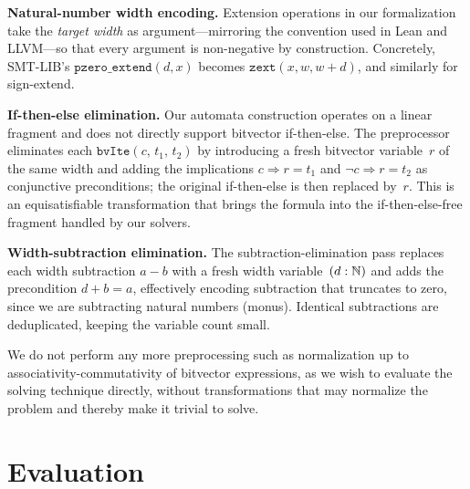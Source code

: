 \noindent\textbf{Natural-number width encoding.}
Extension operations in our formalization take the \emph{target width}
as argument---mirroring the convention used in Lean and LLVM---so that every
argument is non-negative by construction.
Concretely, SMT-LIB's $\texttt{pzero\_extend}(d, x)$ becomes
$\texttt{zext}(x, w, w{+}d)$, and similarly for sign-extend.

\noindent\textbf{If-then-else elimination.}
Our automata construction operates on a linear fragment and does not
directly support bitvector if-then-else.
The preprocessor eliminates each $\texttt{bvIte}(c,\, t_1,\, t_2)$
by introducing a fresh bitvector variable~$r$ of the same width
and adding the implications
$c \Rightarrow r = t_1$ and $\lnot c \Rightarrow r = t_2$
as conjunctive preconditions; the original if-then-else is then replaced by~$r$.
This is an equisatisfiable transformation that brings the formula
into the if-then-else-free fragment handled by our solvers.

\noindent\textbf{Width-subtraction elimination.}
The subtraction-elimination pass replaces each width subtraction $a - b$
with a fresh width variable~$(d : \mathbb N)$ and adds the precondition $d + b = a$,
effectively encoding subtraction that truncates to zero, since we are subtracting natural numbers (monus).
Identical subtractions are deduplicated, keeping the variable count small.

We do not perform any more preprocessing such as normalization up to associativity-commutativity of bitvector expressions,
as we wish to evaluate the solving technique directly, without transformations that may normalize the problem and thereby make it trivial to solve.

\section{Evaluation}
\label{sec:mwbv:evaluation}

